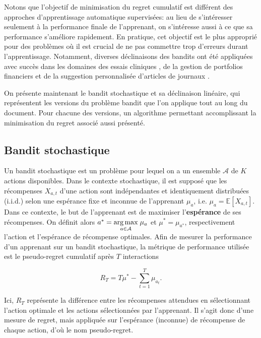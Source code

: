 Notons que l'objectif de minimisation du regret cumulatif est différent des approches d'apprentissage automatique
supervisées: au lieu de s'intéresser seulement à la performance finale de
l'apprenant, on s'intéresse aussi à ce que sa performance s'améliore
rapidement.
En pratique, cet objectif est le plus approprié pour des problèmes
où il est crucial de ne pas commettre trop d'erreurs durant l'apprentissage.
Notamment, diverses déclinaisons des bandits ont été appliquées avec succès dans
les domaines des essais cliniques \citep{kuleshov2014algorithms}, de
la gestion de portfolios financiers \citep{10.5555/2832249.2832384} et
de la suggestion personnalisée d'articles de journaux \citep{Li_2010}.

On présente maintenant le bandit stochastique et sa déclinaison linéaire,
qui représentent les versions du problème bandit que l'on applique tout au long du document.
Pour chacune des versions, un algorithme permettant accomplissant la minimisation 
du regret associé aussi présenté.

\subsection{Bandit stochastique}
\label{subsec:bandit_stochastique}

Un bandit stochastique \citep{lairobbins} est un problème pour lequel on a un ensemble
$\mathcal{A}$ de $K$ actions disponibles.
Dans le contexte stochastique, il est supposé que les récompenses $X_{a,t}$
d'une action sont indépendantes et identiquement distribuées (i.i.d.) 
selon une espérance fixe et inconnue de l'apprenant $\mu_a$, i.e. $\mu_a = \mathbb{E} \left[X_{a,t} \right]$.
Dans ce contexte, le but de l'apprenant est de maximiser l'\textbf{espérance} de ses récompenses.
On définit alors $a^* = \underset{a \in \mathcal{A}}{\operatorname*{arg\,max}} \; \mu_a$
et $\mu^* = \mu_{a^*}$, respectivement l'action et l'espérance de récompense optimales.
Afin de mesurer la performance d'un apprenant sur un bandit stochastique, la métrique de performance
utilisée est le pseudo-regret cumulatif après $T$ interactions

\begin{equation}
    R_T = T \mu^* -  \sum_{t=1}^T  \mu_{a_t}.
    \label{eq:regret_cumulatif}
\end{equation}

Ici, $R_T$ représente la différence entre les récompenses attendues en sélectionnant
l'action optimale et les actions sélectionnées par l'apprenant.
Il s'agit donc d'une mesure de regret, mais appliquée sur l'espérance (inconnue)
de récompense de chaque action, d'où le nom pseudo-regret.

